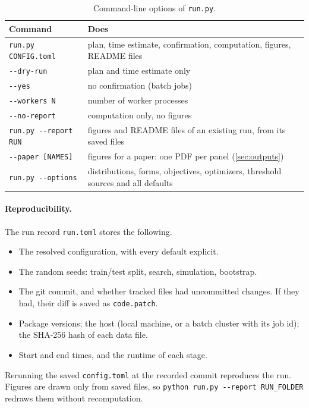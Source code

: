 \documentclass[11pt]{article}
\newcommand{\code}[1]{\texttt{#1}}
\begin{document}
\begin{table}[ht]
\centering\small
\begin{tabularx}{\linewidth}{@{}l L@{}}
\toprule
Command & Does \\
\midrule
\code{run.py CONFIG.toml} & plan, time estimate, confirmation, computation, figures, README files \\
\quad\code{-{}-dry-run} & plan and time estimate only \\
\quad\code{-{}-yes} & no confirmation (batch jobs) \\
\quad\code{-{}-workers N} & number of worker processes \\
\quad\code{-{}-no-report} & computation only, no figures \\
\code{run.py -{}-report RUN} & figures and README files of an existing run, from its saved files \\
\quad\code{-{}-paper [NAMES]} & figures for a paper: one PDF per panel (\cref{sec:outputs}) \\
\code{run.py -{}-options} & distributions, forms, objectives, optimizers, threshold sources and all defaults \\
\bottomrule
\end{tabularx}
\caption{Command-line options of \code{run.py}.}
\label{tab:cli}
\end{table}

\paragraph{Reproducibility.} The run record \code{run.toml} stores the following.
\begin{itemize}
    \item The resolved configuration, with every default explicit.
    \item The random seeds: train/test split, search, simulation, bootstrap.
    \item The git commit, and whether tracked files had uncommitted changes. If they had, their diff is saved as \code{code.patch}.
    \item Package versions; the host (local machine, or a batch cluster with its job id); the SHA-256 hash of each data file.
    \item Start and end times, and the runtime of each stage.
\end{itemize}
Rerunning the saved \code{config.toml} at the recorded commit reproduces the run. Figures are drawn only from saved files, so \code{python run.py -{}-report RUN\_FOLDER} redraws them without recomputation.
\end{document}
